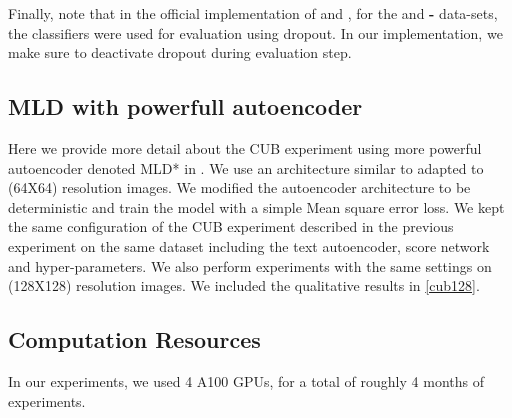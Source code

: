 Finally, note that in the official implementation of \cite{sutter2021generalized} and \cite{tcmvaehwang21}, for the \textbf{\polymnist} and \textbf{\mnist-\svhn} data-sets, the classifiers were used for evaluation using dropout. In our implementation, we make sure to deactivate dropout during evaluation step.

\subsection{MLD with powerfull autoencoder}

Here we provide more detail about the CUB experiment using 
 more powerful autoencoder denoted \gls{MLD}* in . We use an architecture similar to \cite{Rombach_2022_CVPR} adapted to (64X64) resolution images. We modified the autoencoder architecture to be deterministic and train the model with a simple Mean square error loss. We kept the same configuration of the CUB experiment described in the previous experiment on the same dataset including the text autoencoder, score network and hyper-parameters. 
We also perform experiments with the same settings on (128X128) resolution images. We included the qualitative results in \cref{cub128}.

\subsection{Computation Resources}
In our experiments, we used 4 A100 GPUs, for a total of roughly 4 months of experiments.